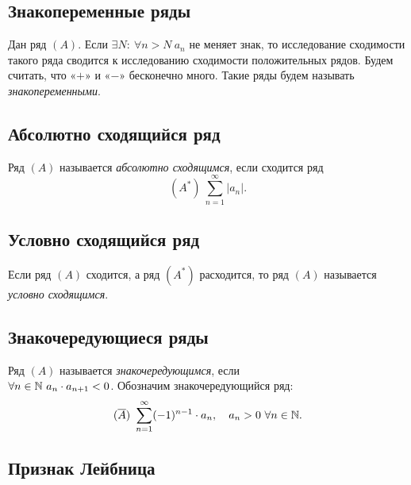 \subsection{Знакопеременные ряды}

\begin{note}
    Дан ряд $(A)$. Если $\exists N: \ \forall n > N \ a_n$ не меняет знак, то исследование сходимости такого ряда сводится к исследованию сходимости положительных рядов. Будем считать, что «$+$» и «$-$» бесконечно много. Такие ряды будем называть \emph{знакопеременными}.
\end{note}

\subsection{Абсолютно сходящийся ряд}

\begin{definition}
    Ряд $(A)$ называется \emph{абсолютно сходящимся}, если сходится ряд
    \[
        (A^*) \ \sum_{n=1}^{\infty}|a_n|.
    \]
\end{definition}

\subsection{Условно сходящийся ряд}

\begin{definition}
    Если ряд $(A)$ сходится, а ряд $(A^*)$ расходится, то ряд $(A)$ называется \emph{условно сходящимся}.
\end{definition}

\subsection{Знакочередующиеся ряды}

\begin{definition}
    Ряд $(A)$ называется \emph{знакочередующимся}, если \\ $\forall n \in \mathbb{N}  \ a_n \cdot a_{n+1} < 0$. Обозначим знакочередующийся ряд:
    \[
        (\overline{A}) \ \sum_{n=1}^{\infty}(-1)^{n-1}\cdot a_n, \quad a_n > 0 \ \forall n \in\N.
    \]
\end{definition}

\newpage

\subsection{Признак Лейбница}


